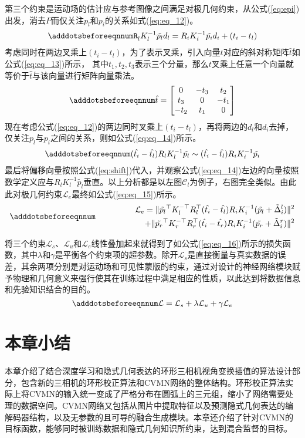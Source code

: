 第三个约束是运动场的估计应与参考图像之间满足对极几何约束，从公式(\ref{eq:epi})出发，消去$P$而仅关注$p_l$和$p_i$的关系如式(\ref{eq:eq_12})。
\begin{equation} \label{eq:eq_12}
    \adddotsbeforeeqnnum%
    R_l K_l^{-1}\tilde{p_l}d_l  =  R_i K_i^{-1}\tilde{p_i}d_i + (t_i - t_l)
\end{equation}
考虑同时在两边叉乘上$(t_i - t_l)$，为了表示叉乘，引入向量$t$对应的斜对称矩阵$\hat{t}$如公式(\ref{eq:eq_13})所示， 其中$t_1, t_2, t_3$表示三个分量，那么$t$叉乘上任意一个向量就等价于$\hat{t}$与该向量进行矩阵向量乘法。
\begin{equation} \label{eq:eq_13}
    \adddotsbeforeeqnnum%
    \hat{t} = \begin{bmatrix}
       0 & -t_3 & t_2  \\
       t_3 & 0  & -t_1 \\
       -t_2  & t_1 & 0
     \end{bmatrix}
\end{equation}
现在考虑公式(\ref{eq:eq_12})的两边同时叉乘上$(t_i - t_l)$，再将两边的$d_l$和$d_i$去掉，仅关注$p_l$与$p_i$之间的关系，则如公式(\ref{eq:eq_14})所示。
\begin{equation} \label{eq:eq_14}
    \adddotsbeforeeqnnum%
    (\hat{t_i} - \hat{t_l})R_l K_l^{-1}\tilde{p_l}  \sim  (\hat{t_i} - \hat{t_l})R_i K_i^{-1}\tilde{p_i}
\end{equation}
最后将偏移向量按照公式(\ref{eq:shift})代入，并观察公式(\ref{eq:eq_14})左边的向量按照数学定义应与$R_l K_l^{-1}\tilde{p_l}$垂直。以上分析都是以左图$\mathcal{C}_l$为例子，右图完全类似。由此此对极几何约束$\mathcal{L}_e$最终如公式(\ref{eq:eq_15})所示。
\begin{equation} \label{eq:eq_15}
\adddotsbeforeeqnnum%
    \begin{split}
        \mathcal{L}_e = \|\tilde{p_l}^\top K_l^{-\top} R_l^\top (\hat{t_i} - \hat{t_l})R_i K_i^{-1}(\tilde{p_l} + \tilde{\Delta}_i^l)\|^2 \\
       \qquad \qquad \qquad  + \|\tilde{p_r}^\top K_r^{-\top} R_r^\top (\hat{t_i} - \hat{t_r})R_i K_i^{-1}(\tilde{p_r} + \tilde{\Delta}_i^r)\|^2
    \end{split}
\end{equation}

将三个约束$\mathcal{L}_s$、$\mathcal{L}_u$和$\mathcal{L}_e$线性叠加起来就得到了如公式(\ref{eq:eq_16})所示的损失函数，其中$\lambda$和$\gamma$是平衡各个约束项的超参数。除开$\mathcal{L}_s$是直接衡量与真实数据的误差，其余两项分别是对运动场和可见性蒙版的约束，通过对设计的神经网络模块赋予物理和几何意义来强行使其在训练过程中满足相应的性质，以此达到将数据信息和先验知识结合的目的。
\begin{equation} \label{eq:eq_16}
\adddotsbeforeeqnnum%
        \mathcal{L} = \mathcal{L}_s + \lambda\mathcal{L}_u + \gamma\mathcal{L}_e 
\end{equation}

\section{本章小结}
本章介绍了结合深度学习和隐式几何表达的环形三相机视角变换插值的算法设计部分，包含新的三相机的环形校正算法和CVMN网络的整体结构。环形校正算法实际上将CVMN的输入统一变成了严格分布在圆弧上的三元组，缩小了网络需要处理的数据空间。CVMN网络又包括从图片中提取特征以及预测隐式几何表达的编解码器结构，以及无参数的且可导的融合生成模块。本章还介绍了针对CVMN的目标函数，能够同时被训练数据和隐式几何知识所约束，达到混合监督的目标。

